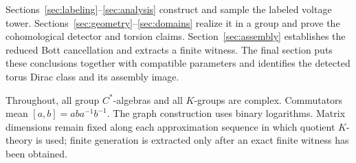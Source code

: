Sections~\ref{sec:labeling}--\ref{sec:analysis} construct and sample the
labeled voltage tower. Sections~\ref{sec:geometry}--\ref{sec:domains}
realize it in a group and prove the cohomological detector and torsion
claims. Section~\ref{sec:assembly} establishes the reduced Bott
cancellation and extracts a finite witness. The final section puts these
conclusions together with compatible parameters and identifies the
detected torus Dirac class and its assembly image.

Throughout, all group $C^*$-algebras and all $K$-groups are complex.
Commutators mean $[a,b]=aba^{-1}b^{-1}$.  The graph construction uses
binary logarithms.  Matrix dimensions remain fixed along each
approximation sequence in which quotient $K$-theory is used; finite
generation is extracted only after an exact finite witness has been
obtained.
